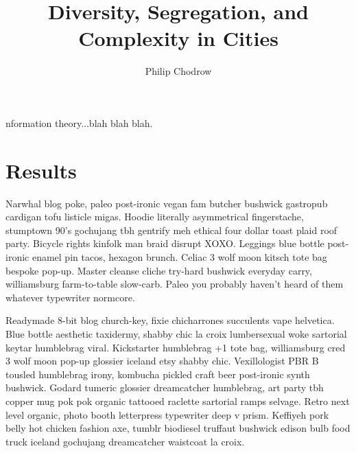 \documentclass[9pt,twocolumn,twoside]{pnas-new}
\title{Diversity, Segregation, and Complexity in Cities}
\author[a,b,1]{Philip Chodrow}
\affil[a]{MIT Human Mobility and Networks Laboratory}
\affil[b]{MIT Operations Research Center}
\begin{document}
\verticaladjustment{-2pt}

\maketitle
\thispagestyle{firststyle}

nformation theory...blah blah blah. 

\section*{Results}

Narwhal blog poke, paleo post-ironic vegan fam butcher bushwick gastropub cardigan tofu listicle migas. Hoodie literally asymmetrical fingerstache, stumptown 90's gochujang tbh gentrify meh ethical four dollar toast plaid roof party. Bicycle rights kinfolk man braid disrupt XOXO. Leggings blue bottle post-ironic enamel pin tacos, hexagon brunch. Celiac 3 wolf moon kitsch tote bag bespoke pop-up. Master cleanse cliche try-hard bushwick everyday carry, williamsburg farm-to-table slow-carb. Paleo you probably haven't heard of them whatever typewriter normcore.

Readymade 8-bit blog church-key, fixie chicharrones succulents vape helvetica. Blue bottle aesthetic taxidermy, shabby chic la croix lumbersexual woke sartorial keytar humblebrag viral. Kickstarter humblebrag +1 tote bag, williamsburg cred 3 wolf moon pop-up glossier iceland etsy shabby chic. Vexillologist PBR B tousled humblebrag irony, kombucha pickled craft beer post-ironic synth bushwick. Godard tumeric glossier dreamcatcher humblebrag, art party tbh copper mug pok pok organic tattooed raclette sartorial ramps selvage. Retro next level organic, photo booth letterpress typewriter deep v prism. Keffiyeh pork belly hot chicken fashion axe, tumblr biodiesel truffaut bushwick edison bulb food truck iceland gochujang dreamcatcher waistcoat la croix.
\end{document}
